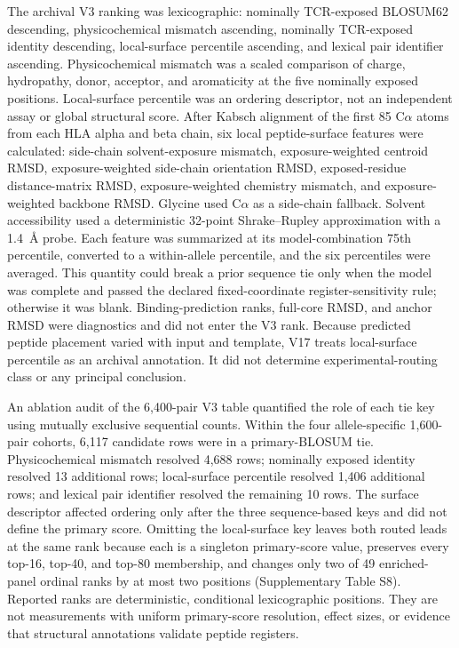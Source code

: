 \documentclass[11pt]{article}
\begin{document}
The archival V3 ranking was lexicographic: nominally TCR-exposed BLOSUM62 descending, physicochemical mismatch ascending, nominally TCR-exposed identity descending, local-surface percentile ascending, and lexical pair identifier ascending. Physicochemical mismatch was a scaled comparison of charge, hydropathy, donor, acceptor, and aromaticity at the five nominally exposed positions. Local-surface percentile was an ordering descriptor, not an independent assay or global structural score. After Kabsch alignment of the first 85 C$\alpha$ atoms from each HLA alpha and beta chain, six local peptide-surface features were calculated: side-chain solvent-exposure mismatch, exposure-weighted centroid RMSD, exposure-weighted side-chain orientation RMSD, exposed-residue distance-matrix RMSD, exposure-weighted chemistry mismatch, and exposure-weighted backbone RMSD. Glycine used C$\alpha$ as a side-chain fallback. Solvent accessibility used a deterministic 32-point Shrake--Rupley approximation with a 1.4~\AA{} probe. Each feature was summarized at its model-combination 75th percentile, converted to a within-allele percentile, and the six percentiles were averaged. This quantity could break a prior sequence tie only when the model was complete and passed the declared fixed-coordinate register-sensitivity rule; otherwise it was blank. Binding-prediction ranks, full-core RMSD, and anchor RMSD were diagnostics and did not enter the V3 rank. Because predicted peptide placement varied with input and template, V17 treats local-surface percentile as an archival annotation. It did not determine experimental-routing class or any principal conclusion.

An ablation audit of the 6,400-pair V3 table quantified the role of each tie key using mutually exclusive sequential counts. Within the four allele-specific 1,600-pair cohorts, 6,117 candidate rows were in a primary-BLOSUM tie. Physicochemical mismatch resolved 4,688 rows; nominally exposed identity resolved 13 additional rows; local-surface percentile resolved 1,406 additional rows; and lexical pair identifier resolved the remaining 10 rows. The surface descriptor affected ordering only after the three sequence-based keys and did not define the primary score. Omitting the local-surface key leaves both routed leads at the same rank because each is a singleton primary-score value, preserves every top-16, top-40, and top-80 membership, and changes only two of 49 enriched-panel ordinal ranks by at most two positions (Supplementary Table S8). Reported ranks are deterministic, conditional lexicographic positions. They are not measurements with uniform primary-score resolution, effect sizes, or evidence that structural annotations validate peptide registers.
\end{document}
